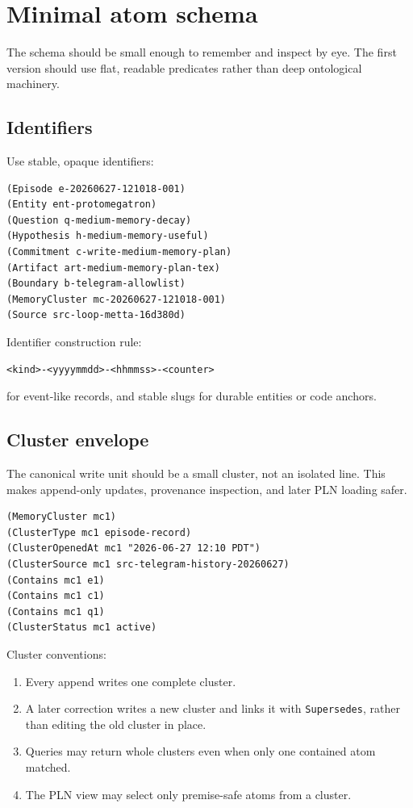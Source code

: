 \documentclass[11pt]{article}
\begin{document}
\section{Minimal atom schema}

The schema should be small enough to remember and inspect by eye.  The first version
should use flat, readable predicates rather than deep ontological machinery.

\subsection{Identifiers}

Use stable, opaque identifiers:
\begin{verbatim}
(Episode e-20260627-121018-001)
(Entity ent-protomegatron)
(Question q-medium-memory-decay)
(Hypothesis h-medium-memory-useful)
(Commitment c-write-medium-memory-plan)
(Artifact art-medium-memory-plan-tex)
(Boundary b-telegram-allowlist)
(MemoryCluster mc-20260627-121018-001)
(Source src-loop-metta-16d380d)
\end{verbatim}

Identifier construction rule:
\begin{verbatim}
<kind>-<yyyymmdd>-<hhmmss>-<counter>
\end{verbatim}
for event-like records, and stable slugs for durable entities or code anchors.

\subsection{Cluster envelope}

The canonical write unit should be a small cluster, not an isolated line.  This makes
append-only updates, provenance inspection, and later PLN loading safer.

\begin{verbatim}
(MemoryCluster mc1)
(ClusterType mc1 episode-record)
(ClusterOpenedAt mc1 "2026-06-27 12:10 PDT")
(ClusterSource mc1 src-telegram-history-20260627)
(Contains mc1 e1)
(Contains mc1 c1)
(Contains mc1 q1)
(ClusterStatus mc1 active)
\end{verbatim}

Cluster conventions:
\begin{enumerate}
  \item Every append writes one complete cluster.
  \item A later correction writes a new cluster and links it with \texttt{Supersedes},
        rather than editing the old cluster in place.
  \item Queries may return whole clusters even when only one contained atom matched.
  \item The PLN view may select only premise-safe atoms from a cluster.
\end{enumerate}
\end{document}
